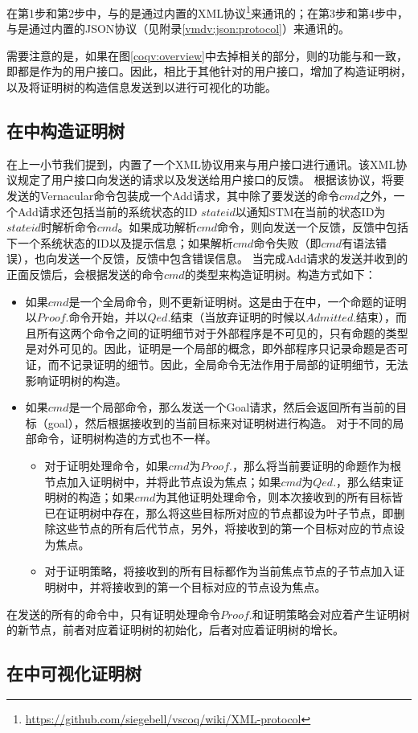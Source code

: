 在第1步和第2步中，与的是通过内置的XML协议\footnote{\url{https://github.com/siegebell/vscoq/wiki/XML-protocol}}来通讯的；在第3步和第4步中，与是通过内置的JSON协议（见附录\ref{vmdv:json:protocol}）来通讯的。

需要注意的是，如果在图\ref{coqv:overview}中去掉相关的部分，则的功能与和一致，即都是作为的用户接口。因此，相比于其他针对的用户接口，增加了构造证明树，以及将证明树的构造信息发送到以进行可视化的功能。

\subsection{在中构造证明树}
在上一小节我们提到，内置了一个XML协议用来与用户接口进行通讯。该XML协议规定了用户接口向发送的请求以及发送给用户接口的反馈。
根据该协议，将要发送的Vernacular命令包装成一个Add请求，其中除了要发送的命令$cmd$之外，一个Add请求还包括当前的系统状态的ID $stateid$以通知STM在当前的状态ID为$stateid$时解析命令$cmd$。如果成功解析$cmd$命令，则向发送一个反馈，反馈中包括下一个系统状态的ID以及提示信息；如果解析$cmd$命令失败（即$cmd$有语法错误），也向发送一个反馈，反馈中包含错误信息。
当完成Add请求的发送并收到的正面反馈后，会根据发送的命令$cmd$的类型来构造证明树。构造方式如下：
\begin{itemize}
	\item 如果$cmd$是一个全局命令，则不更新证明树。这是由于在中，一个命题的证明以$Proof.$命令开始，并以$Qed.$结束（当放弃证明的时候以$Admitted.$结束），而且所有这两个命令之间的证明细节对于外部程序是不可见的，只有命题的类型是对外可见的。因此，证明是一个局部的概念，即外部程序只记录命题是否可证，而不记录证明的细节。因此，全局命令无法作用于局部的证明细节，无法影响证明树的构造。
	\item 如果$cmd$是一个局部命令，那么发送一个Goal请求，然后会返回所有当前的目标（goal），然后根据接收到的当前目标来对证明树进行构造。
	对于不同的局部命令，证明树构造的方式也不一样。
	\begin{itemize}
		\item 对于证明处理命令，如果$cmd$为$Proof.$，那么将当前要证明的命题作为根节点加入证明树中，并将此节点设为焦点；如果$cmd$为$Qed.$，那么结束证明树的构造；如果$cmd$为其他证明处理命令，则本次接收到的所有目标皆已在证明树中存在，那么将这些目标所对应的节点都设为叶子节点，即删除这些节点的所有后代节点，另外，将接收到的第一个目标对应的节点设为焦点。
		\item 对于证明策略，将接收到的所有目标都作为当前焦点节点的子节点加入证明树中，并将接收到的第一个目标对应的节点设为焦点。
	\end{itemize}
\end{itemize}
在发送的所有的命令中，只有证明处理命令$Proof.$和证明策略会对应着产生证明树的新节点，前者对应着证明树的初始化，后者对应着证明树的增长。

\subsection{在中可视化证明树}
